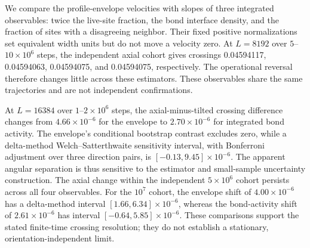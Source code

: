 We compare the profile-envelope velocities with slopes of three integrated
observables: twice the live-site fraction, the bond interface density, and
the fraction of sites with a disagreeing neighbor. Their fixed positive
normalizations set equivalent width units but do not move a velocity zero.
At $L=8192$ over $5$--$10\times10^6$ steps, the independent axial cohort
gives crossings 0.04594117, 0.04594063, 0.04594075, and 0.04594075,
respectively. The operational reversal therefore changes little across
these estimators. These observables share the same trajectories and are
not independent confirmations.

At $L=16384$ over $1$--$2\times10^6$ steps, the axial-minus-tilted
crossing difference changes from $4.66\times10^{-6}$ for the envelope
to $2.70\times10^{-6}$ for integrated bond activity. The envelope's
conditional bootstrap contrast excludes zero, while a delta-method
Welch--Satterthwaite sensitivity interval, with Bonferroni adjustment over
three direction pairs, is $[-0.13,9.45]\times10^{-6}$. The apparent angular
separation is thus sensitive to the estimator and small-sample uncertainty
construction. The axial change within the independent $5\times10^6$ cohort
persists across all four observables. For the $10^7$ cohort, the envelope
shift of $4.00\times10^{-6}$ has a delta-method interval
$[1.66,6.34]\times10^{-6}$, whereas the bond-activity shift of
$2.61\times10^{-6}$ has interval $[-0.64,5.85]\times10^{-6}$.
These comparisons support the stated finite-time crossing resolution;
they do not establish a stationary, orientation-independent limit.

